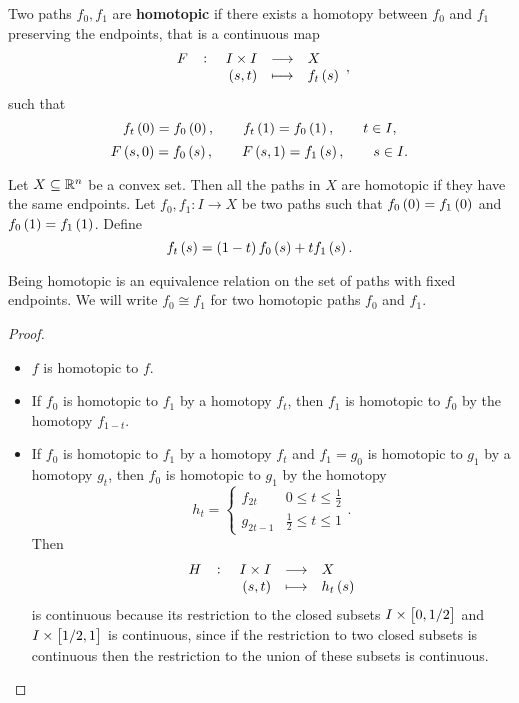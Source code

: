 \begin{definition*}
Two paths $ f_0, f_1 $ are \textbf{homotopic} if there exists a homotopy between $ f_0 $ and $ f_1 $ preserving the endpoints, that is a continuous map
$$ \function[F]{I \times I}{X}{\br{s, t}}{f_t\br{s}}, $$
such that
$$ f_t\br{0} = f_0\br{0}, \qquad f_t\br{1} = f_0\br{1}, \qquad t \in I, $$
$$ F\br{s, 0} = f_0\br{s}, \qquad F\br{s, 1} = f_1\br{s}, \qquad s \in I. $$
\end{definition*}

\begin{example*}
Let $ X \subseteq \mathbb{R}^n $ be a convex set. Then all the paths in $ X $ are homotopic if they have the same endpoints. Let $ f_0, f_1 : I \to X $ be two paths such that $ f_0\br{0} = f_1\br{0} $ and $ f_0\br{1} = f_1\br{1} $. Define
$$ f_t\br{s} = \br{1 - t}f_0\br{s} + tf_1\br{s}. $$
\end{example*}

\begin{lemma}
Being homotopic is an equivalence relation on the set of paths with fixed endpoints. We will write $ f_0 \cong f_1 $ for two homotopic paths $ f_0 $ and $ f_1 $.
\end{lemma}

\begin{proof}
\hfill
\begin{itemize}
\item $ f $ is homotopic to $ f $.
\item If $ f_0 $ is homotopic to $ f_1 $ by a homotopy $ f_t $, then $ f_1 $ is homotopic to $ f_0 $ by the homotopy $ f_{1 - t} $.
\item If $ f_0 $ is homotopic to $ f_1 $ by a homotopy $ f_t $ and $ f_1 = g_0 $ is homotopic to $ g_1 $ by a homotopy $ g_t $, then $ f_0 $ is homotopic to $ g_1 $ by the homotopy
$$ h_t =
\begin{cases}
f_{2t} & 0 \le t \le \tfrac{1}{2} \\
g_{2t - 1} & \tfrac{1}{2} \le t \le 1
\end{cases}.
$$
Then
$$ \function[H]{I \times I}{X}{\br{s, t}}{h_t\br{s}} $$
is continuous because its restriction to the closed subsets $ I \times \sbr{0, 1 / 2} $ and $ I \times \sbr{1 / 2, 1} $ is continuous, since if the restriction to two closed subsets is continuous then the restriction to the union of these subsets is continuous.
\end{itemize}
\end{proof}

\pagebreak

